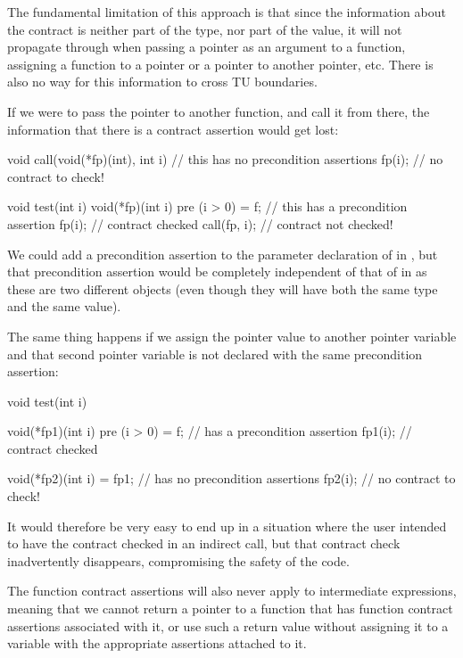 The fundamental limitation of this approach is that since the information about the contract is neither part of the type, nor part of the value, it will not propagate through when passing a pointer as an argument to a function, assigning a function to a pointer or a pointer to another pointer, etc. There is also no way for this information to cross TU boundaries.

If we were to pass the pointer  to another function, and call it from there, the information that there is a contract assertion would get lost:
\begin{codeblock}
void call(void(*fp)(int), int i) {    // this  has no precondition assertions
  fp(i);       // no contract to check!
}

void test(int i) {
  void(*fp)(int i) pre (i > 0) = f;   // this  has a precondition assertion
  fp(i);       // contract  checked
  call(fp, i); // contract  not checked!
}
\end{codeblock}
We could add a precondition assertion to the parameter declaration of  in , but that precondition assertion would be completely independent of that of  in  as these are two different objects (even though they will have both the same type and the same value).

The same thing happens if we assign the pointer value to another pointer variable and that second pointer variable is not declared with the same precondition assertion:
\begin{codeblock}
void test(int i) {
  void(*fp1)(int i) pre (i > 0) = f;   //  has a precondition assertion
  fp1(i);   // contract  checked
  
  void(*fp2)(int i) = fp1;             //  has no precondition assertions
  fp2(i);  // no contract to check!
}
\end{codeblock}
It would therefore be very easy to end up in a situation where the user intended to have the contract checked in an indirect call, but that contract check inadvertently disappears, compromising the safety of the code.

The function contract assertions will also never apply to intermediate expressions, meaning that we cannot return a pointer to a function that has function contract assertions associated with it, or use such a return value without assigning it to a variable with the appropriate assertions attached to it.

